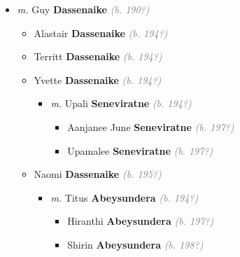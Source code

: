 \documentclass[10pt, openany]{book}
\begin{document}
\begin{itemize}
{\begin{itemize}
{\begin{itemize}
\item{\textit{m.} Guy \textbf{Dassenaike} \textcolor{gray}{\textit{(b. 190?)}}   \label{couple:00001602:00001603} \begin{itemize}
\item{Alastair \textbf{Dassenaike} \textcolor{gray}{\textit{(b. 194?)}}
 }
\item{Territt \textbf{Dassenaike} \textcolor{gray}{\textit{(b. 194?)}}
 }
\item{Yvette \textbf{Dassenaike} \textcolor{gray}{\textit{(b. 194?)}}
\begin{itemize}
\item{\textit{m.} Upali \textbf{Seneviratne} \textcolor{gray}{\textit{(b. 194?)}}   \label{couple:00001611:00001612} \begin{itemize}
\item{Aanjanee June \textbf{Seneviratne} \textcolor{gray}{\textit{(b. 197?)}}
  }
\item{Upamalee \textbf{Seneviratne} \textcolor{gray}{\textit{(b. 197?)}}
 }
\end{itemize}}
\end{itemize}
 }
\item{Naomi \textbf{Dassenaike} \textcolor{gray}{\textit{(b. 195?)}}
\begin{itemize}
\item{\textit{m.} Titus \textbf{Abeysundera} \textcolor{gray}{\textit{(b. 194?)}}   \label{couple:00001604:00001605} \begin{itemize}
\item{Hiranthi \textbf{Abeysundera} \textcolor{gray}{\textit{(b. 197?)}}
 }
\item{Shirin \textbf{Abeysundera} \textcolor{gray}{\textit{(b. 198?)}}
 }
\end{itemize}}
\end{itemize}
 }
\end{itemize}}
\end{itemize}
  }
\end{itemize}}
\end{itemize}
   
\end{document}
